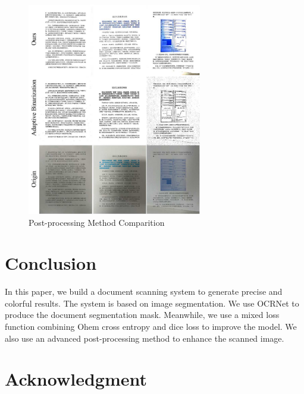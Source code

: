 \documentclass[10pt, conference, compsocconf]{IEEEtran}
\begin{document}
\begin{figure}[!h]
	\centering
	\label{figure:post-process}
	\includegraphics[width=3.0in]{./Assets/12345.jpg}
	\caption{Post-processing Method Comparition}
\end{figure}



\section{Conclusion}

In this paper, we build a document scanning system to generate precise and colorful results.
The system is based on image segmentation. We use OCRNet to produce the document segmentation mask. Meanwhile, we use a mixed loss function combining Ohem cross entropy and dice loss to improve the model.
We also use an advanced post-processing method to enhance the scanned image.



\section*{Acknowledgment}


\end{document}
